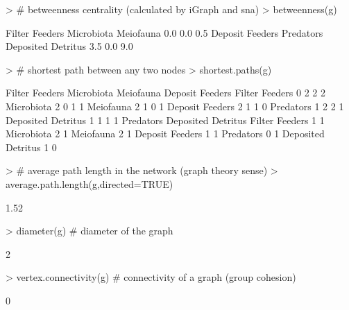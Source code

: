 \documentclass[11pt]{article}
\begin{document}
\begin{Schunk}
\begin{Sinput}
> # betweenness centrality (calculated by iGraph and sna)
> betweenness(g) 
\end{Sinput}
\begin{Soutput}
    Filter Feeders         Microbiota          Meiofauna 
               0.0                0.0                0.5 
   Deposit Feeders          Predators Deposited Detritus 
               3.5                0.0                9.0 
\end{Soutput}
\begin{Sinput}
> # shortest path between any two nodes
> shortest.paths(g) 
\end{Sinput}
\begin{Soutput}
                   Filter Feeders Microbiota Meiofauna Deposit Feeders
Filter Feeders                  0          2         2               2
Microbiota                      2          0         1               1
Meiofauna                       2          1         0               1
Deposit Feeders                 2          1         1               0
Predators                       1          2         2               1
Deposited Detritus              1          1         1               1
                   Predators Deposited Detritus
Filter Feeders             1                  1
Microbiota                 2                  1
Meiofauna                  2                  1
Deposit Feeders            1                  1
Predators                  0                  1
Deposited Detritus         1                  0
\end{Soutput}
\begin{Sinput}
> # average path length in the network (graph theory sense)
> average.path.length(g,directed=TRUE)   
\end{Sinput}
\begin{Soutput}
[1] 1.52
\end{Soutput}
\begin{Sinput}
> diameter(g)  # diameter of the graph
\end{Sinput}
\begin{Soutput}
[1] 2
\end{Soutput}
\begin{Sinput}
> vertex.connectivity(g)  # connectivity of a graph (group cohesion)
\end{Sinput}
\begin{Soutput}
[1] 0
\end{Soutput}
\begin{Sinput}

\end{Sinput}
\end{Schunk}
\end{document}
